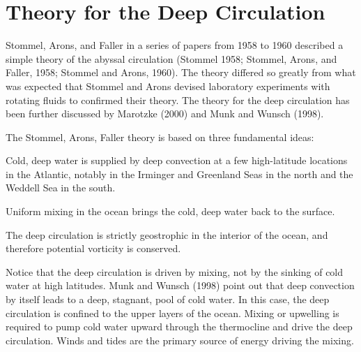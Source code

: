 \section{Theory for the Deep Circulation}
Stommel, Arons,
and Faller in a series of papers from 1958 to 1960 described a simple
theory of the abyssal circulation (Stommel 1958; Stommel, Arons, and Faller,
1958; Stommel and Arons, 1960). The theory differed so greatly from
what was expected that Stommel and Arons devised laboratory
experiments with rotating fluids to confirmed their theory. The theory
for the deep circulation has been further discussed by Marotzke (2000)
and Munk and Wunsch (1998).

The Stommel, Arons, Faller theory is based on three fundamental ideas:
\begin{enumerate}

\vitem Cold, deep water is supplied by deep convection at a few
high-latitude locations in the Atlantic, notably in the Irminger and
Greenland Seas in the north and the Weddell Sea in the south.

\vitem Uniform mixing in the ocean brings
the cold, deep water back to the surface.

\vitem The deep circulation is strictly geostrophic in the
interior of the ocean, and
therefore potential vorticity is conserved.
\end{enumerate}

Notice that the deep circulation is driven by
mixing, not by the sinking of cold water
at high latitudes. Munk and Wunsch (1998) point out that deep
convection by itself leads to a deep, stagnant, pool of cold water. In
this case, the deep circulation is confined to the upper layers of the
ocean. Mixing or upwelling is
required to pump cold water upward through the
thermocline
and drive the deep circulation. Winds and tides are the primary source
of energy driving the mixing.

